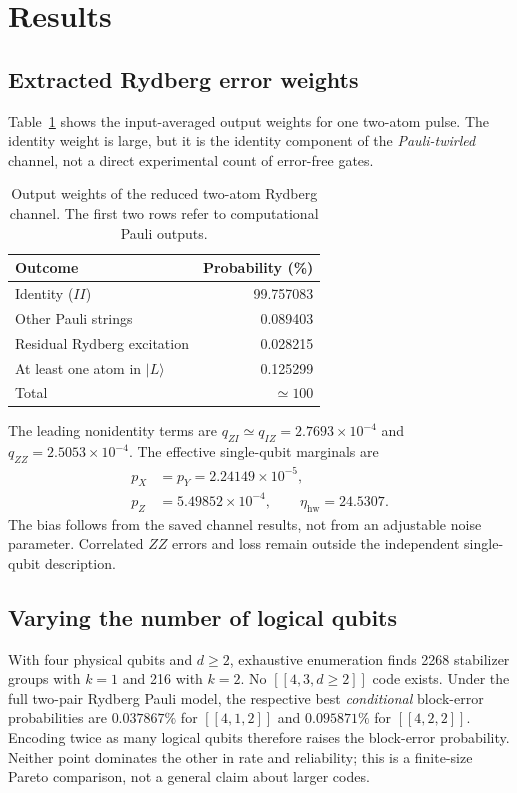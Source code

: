 \section{Results}
\label{sec:results}
\subsection{Extracted Rydberg error weights}
Table~\ref{tab:res_channel} shows the input-averaged output weights for
one two-atom pulse. The identity weight is large, but it is the identity
component of the \emph{Pauli-twirled} channel, not a direct experimental
count of error-free gates.

\begin{table}[t]
\caption{Output weights of the reduced two-atom Rydberg channel.
The first two rows refer to computational Pauli outputs.}
\label{tab:res_channel}
\begin{ruledtabular}
\begin{tabular}{lr}
Outcome & Probability (\%)\\
\hline
Identity ($II$) & 99.757083\\
Other Pauli strings & 0.089403\\
Residual Rydberg excitation & 0.028215\\
At least one atom in $|L\rangle$ & 0.125299\\
\hline
Total & $\simeq100$\\
\end{tabular}
\end{ruledtabular}
\end{table}

The leading nonidentity terms are $q_{ZI}\simeq q_{IZ}
=2.7693\times10^{-4}$ and $q_{ZZ}=2.5053\times10^{-4}$.
The effective single-qubit marginals are
\begin{align}
p_X&=p_Y=2.24149\times10^{-5},\nonumber\\
p_Z&=5.49852\times10^{-4},\qquad
\eta_{\mathrm{hw}}=24.5307.
\label{eq:res_eta}
\end{align}
The bias follows from the saved channel results, not from an adjustable
noise parameter. Correlated $ZZ$ errors and loss remain outside the
independent single-qubit description.

\subsection{Varying the number of logical qubits}
With four physical qubits and $d\geq2$, exhaustive enumeration finds
2268 stabilizer groups with $k=1$ and 216 with $k=2$.
No $[[4,3,d\geq2]]$ code exists. Under the full two-pair Rydberg
Pauli model, the respective best \emph{conditional} block-error
probabilities are $0.037867\%$ for $[[4,1,2]]$ and
$0.095871\%$ for $[[4,2,2]]$. Encoding twice as many logical qubits
therefore raises the block-error probability. Neither point dominates
the other in rate and reliability; this is a finite-size Pareto
comparison, not a general claim about larger codes.

